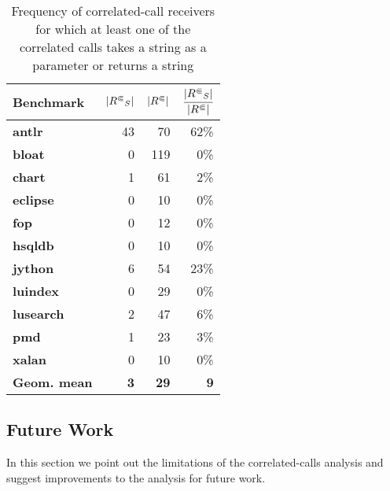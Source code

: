 \begin{table}
\caption{Frequency of correlated-call receivers for which at least one of the correlated calls takes a string as a parameter or returns a string}

\centering
\begin{tabular}{@{}lrrr@{}}
\toprule
\textbf{Benchmark}   & 
  \textbf{$|{R^\Subset}_S|$} & 
  \textbf{$|{R^\Subset}|$} & 
  \textbf{$\cfrac{|{R^\Subset}_S|}{|{R^\Subset}|}$} \\ \midrule
\textbf{antlr}       & 43                     & 70               & 62\%                            \\
\textbf{bloat}       & 0                      & 119              & 0\%                             \\
\textbf{chart}       & 1                      & 61               & 2\%                             \\
\textbf{eclipse}     & 0                      & 10               & 0\%                             \\
\textbf{fop}         & 0                      & 12               & 0\%                             \\
\textbf{hsqldb}      & 0                      & 10               & 0\%                             \\
\textbf{jython}      & 6                      & 54               & 23\%                            \\
\textbf{luindex}     & 0                      & 29               & 0\%                             \\
\textbf{lusearch}    & 2                      & 47               & 6\%                             \\
\textbf{pmd}         & 1                      & 23               & 3\%                             \\
\textbf{xalan}       & 0                      & 10               & 0\%                             \\
\textbf{Geom. mean} & \textbf{3}             & \textbf{29}      & \textbf{9}                    \\ \bottomrule
\end{tabular}
\label{tab:stringstat}
\end{table}

\subsection{Future Work}
In this section we point out the limitations of the correlated-calls analysis and suggest improvements to the analysis for future work. 

